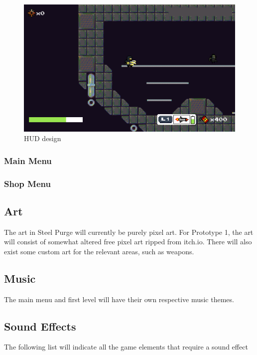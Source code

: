 \documentclass[../Main.tex]{subfiles}
\begin{document}
\begin{figure}[H]
	\centering
	\includegraphics[width=\columnwidth]{Figures/HUD.png}
	\caption{HUD design}
\end{figure}

\subsubsection{Main Menu}
\subsubsection{Shop Menu}

\subsection{Art}

The art in Steel Purge will currently be purely pixel art. For Prototype 1, the art will consist of somewhat altered free pixel art ripped from itch.io. There will also exist some custom art for the relevant areas, such as weapons. 

\subsection{Music}

The main menu and first level will have their own respective music themes. 

\subsection{Sound Effects}

The following list will indicate all the game elements that require a sound effect\newline
\end{document}
